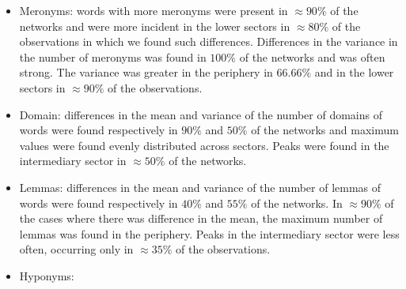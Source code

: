 \begin{itemize}
\begin{itemize}
																																																																																		\item Meronyms:
																																																																																						words with more meronyms were present in $\approx 90\%$ of the networks and were
																																																																																								more incident in the lower sectors in $\approx 80\%$ of the observations in which we found such differences.
																																																																																											Differences in the variance in the number of meronyms was found in $100\%$ of the networks and was often strong.
																																																																																															The variance was greater in the periphery in $66.66\%$ and in the lower sectors in $\approx 90\%$ of the observations.
																																																																																																		\item Domain:
																																																																																																						differences in the mean and variance of the number of domains of words were found respectively in $90\%$ and $50\%$ of the networks and maximum values were found evenly distributed across sectors.
																																																																																																										Peaks were found in the intermediary sector in $\approx 50\%$ of the networks.
																																																																																																													\item Lemmas:
																																																																																																																	differences in the mean and variance of the number of lemmas of words were found respectively in $40\%$ and $55\%$ of the networks.
																																																																																																																					In $\approx 90\%$ of the cases where there was difference in the mean, the maximum number of lemmas was found in the periphery.
																																																																																																																									Peaks in the intermediary sector were less often, occurring only in $\approx 35\%$ of the observations.
																																																																																																																												\item Hyponyms:

\end{itemize}
\end{itemize}
